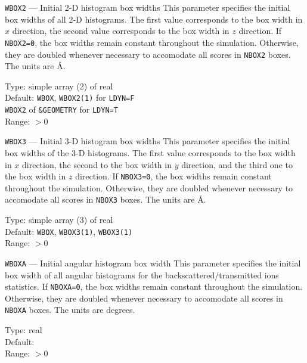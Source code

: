 \begin{keydescription}{\texttt{WBOX2} --- Initial 2-D histogram box widths}
%
  This parameter specifies the initial box widths of all 2-D histograms. The first value 
  corresponds to the box width in $x$ direction, the second value corresponds to the box width 
  in $z$ direction. If \texttt{NBOX2=0}, the box widths remain constant
  throughout the simulation. Otherwise, they are doubled whenever necessary
  to accomodate all scores in \texttt{NBOX2} boxes. The units are \AA.  
  \begin{keytab}
    Type:    \> simple array (2) of real \\
    Default: \> \texttt{WBOX}, \texttt{WBOX2(1)} for \texttt{LDYN=F} \\
             \> \texttt{WBOX2} of \texttt{\&GEOMETRY} for \texttt{LDYN=T} \\
    Range:   \> $> 0$
  \end{keytab}
\end{keydescription}

\begin{keydescription}{\texttt{WBOX3} --- Initial 3-D histogram box widths}
%
  This parameter specifies the initial box widths of the 3-D histograms. The first value 
  corresponds to the box width in $x$ direction, the second to the box width in $y$ direction, 
  and the third one to the box width in $z$ direction. If \texttt{NBOX3=0}, the
  box widths remain constant throughout the simulation. Otherwise, they are
  doubled whenever necessary to accomodate all scores in \texttt{NBOX3} boxes.
  The units are \AA. 
  \begin{keytab}
    Type:    \> simple array (3) of real \\
    Default: \> \texttt{WBOX}, \texttt{WBOX3(1)}, \texttt{WBOX3(1)} \\
    Range:   \> $> 0$
  \end{keytab}
\end{keydescription}

\begin{keydescription}{\texttt{WBOXA} --- Initial angular histogram box width}
%
  This parameter specifies the initial box width of all angular histograms for the 
  backscattered/transmitted ions statistics. If \texttt{NBOXA=0}, the box
  widths remain constant throughout the simulation. Otherwise, they are doubled
  whenever necessary to accomodate all scores in \texttt{NBOXA} boxes. The
  units are degrees. 
  \begin{keytab}
    Type:    \> real \\
    Default:  \\
    Range:   \> $> 0$
  \end{keytab}
\end{keydescription}

